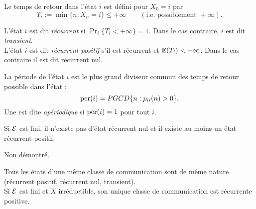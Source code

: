 \begin{definition}
  Le temps de retour dans l'état $i$ est défini pour $X_0 = i$ par
  $$
  T_i := \min\{n : X_n = i\} \leq + \infty \qquad (\text{i.e. possiblement } + \infty).
  $$
\end{definition}

\begin{definition}
  L'état $i$ est dit {\em récurrent} si $\Pr_i\{T_i < + \infty\} = 1$. Dans le cas contraire, $i$ est dit {\em transient}. \\
  L'état $i$ est dit {\em récurrent positif} s'il est récurrent et $\operatorname{\mathbb{E}}(T_i) < + \infty$. Dans le cas contraire il est dit récurrent nul.
\end{definition}


\begin{definition}
  La période de l'état $i$ est le plus grand diviseur commun des temps de retour possible dans l'état :
  $$
  \text{per}(i) = PGCD\{n: p_{ii}(n) > 0\}.
  $$
  Une \cM est dite {\em apériodique} si $\text{per}(i) = 1$ pour tout $i$.
\end{definition}


\begin{proposition}
  Si $\mathcal{E}$ est fini, il n'existe pas d'état récurrent nul et il existe au moins un état récurrent positif.
\end{proposition}

\proof Non démontré. \eproof

\begin{proposition}
  Tous les états d'une même classe de communication sont de même nature (récurrent positif, récurrent nul, transient). \\
  Si $\mathcal{E}$ est fini et $X$ irréductible, son unique classe de communication est récurrente positive.
\end{proposition}

